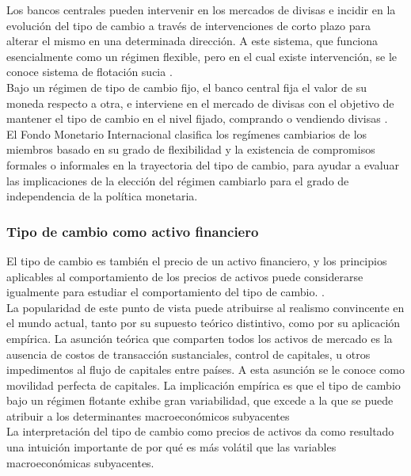 	Los bancos centrales pueden intervenir en los mercados de divisas e incidir en la evolución del tipo de cambio a través de intervenciones de corto plazo para alterar el mismo en una determinada dirección. A este sistema, que funciona esencialmente como un régimen flexible, pero en el cual existe intervención, se le conoce sistema de flotación sucia \parencite{mochon}.\\

	Bajo un régimen de tipo de cambio fijo, el banco central fija el valor de su moneda respecto a otra, e interviene en el mercado de divisas con el objetivo de mantener el tipo de cambio en el nivel fijado, comprando o vendiendo divisas \parencite{mochon}.\\
	
	El Fondo Monetario Internacional clasifica los regímenes cambiarios de los miembros basado en su grado de flexibilidad y la existencia de compromisos formales o informales en la trayectoria del tipo de cambio, para ayudar a evaluar las implicaciones de la elección del régimen cambiarlo para el grado de independencia de la política monetaria. \parencite{imfregime}
	
	\subsubsection{Tipo de cambio como activo financiero}
	El tipo de cambio es también el precio de un activo financiero, y los principios aplicables al comportamiento de los precios de activos puede considerarse igualmente para estudiar el comportamiento del tipo de cambio. \parencite{intecon}.\\
	
	La popularidad de este punto de vista puede atribuirse al realismo convincente en el mundo actual, tanto por su supuesto teórico distintivo, como por su aplicación empírica. La asunción teórica que comparten todos los activos de mercado es la ausencia de costos de transacción sustanciales, control de capitales, u otros impedimentos al flujo de capitales entre países. A esta asunción se le conoce como movilidad perfecta de capitales. La implicación empírica es que el tipo de cambio bajo un régimen flotante exhibe gran variabilidad, que excede a la que se puede atribuir a los determinantes macroeconómicos subyacentes \parencite{frankel1993exchange}\\
	
	La interpretación del tipo de cambio como precios de activos da como resultado una intuición importante de por qué es más volátil que las variables macroeconómicas subyacentes. \parencite{exchecon}
	
